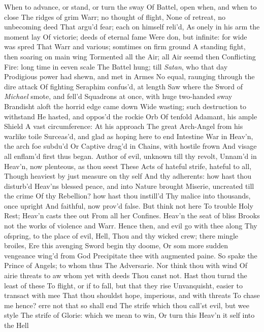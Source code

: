 \documentclass[11pt]{book}
\newcounter {first}
\begin{document}
When to advance, or stand, or turn the sway 
Of Battel, open when, and when to close 
The ridges of grim Warr; no thought of flight, 
None of retreat, no unbecoming deed 
That argu'd fear; each on himself reli'd, 
As onely in his arm the moment lay 
Of victorie; deeds of eternal fame 
Were don, but infinite: for wide was spred 
That Warr and various; somtimes on firm ground 
A standing fight, then soaring on main wing 
Tormented all the Air; all Air seemd then 
Conflicting Fire: long time in eeven scale 
The Battel hung; till \textit{Satan}, who that day 
Prodigious power had shewn, and met in Armes 
No equal, raunging through the dire attack 
Of fighting Seraphim confus'd, at length 
Saw where the Sword of \textit{Michael} smote, and fell'd 
Squadrons at once, with huge two-handed sway 
Brandisht aloft the horrid edge came down 
Wide wasting; such destruction to withstand 
He hasted, and oppos'd the rockie Orb 
Of tenfold Adamant, his ample Shield 
A vast circumference: At his approach 
The great Arch-Angel from his warlike toile 
Surceas'd, and glad as hoping here to end 
Intestine War in Heav'n, the arch foe subdu'd 
Or Captive drag'd in Chains, with hostile frown 
And visage all enflam'd first thus began. 
\quad Author of evil, unknown till thy revolt, 
Unnam'd in Heav'n, now plenteous, as thou seest 
These Acts of hateful strife, hateful to all, 
Though heaviest by just measure on thy self 
And thy adherents: how hast thou disturb'd 
Heav'ns blessed peace, and into Nature brought 
Miserie, uncreated till the crime 
Of thy Rebellion? how hast thou instill'd 
Thy malice into thousands, once upright 
And faithful, now prov'd false.  But think not here 
To trouble Holy Rest; Heav'n casts thee out 
From all her Confines.  Heav'n the seat of bliss 
Brooks not the works of violence and Warr. 
Hence then, and evil go with thee along 
Thy ofspring, to the place of evil, Hell, 
Thou and thy wicked crew; there mingle broiles, 
Ere this avenging Sword begin thy doome, 
Or som more sudden vengeance wing'd from God 
Precipitate thee with augmented paine. 
\quad So spake the Prince of Angels; to whom thus 
The Adversarie.  Nor think thou with wind 
Of airie threats to aw whom yet with deeds 
Thou canst not.  Hast thou turnd the least of these 
To flight, or if to fall, but that they rise 
Unvanquisht, easier to transact with mee 
That thou shouldst hope, imperious, and with threats 
To chase me hence? erre not that so shall end 
The strife which thou call'st evil, but wee style 
The strife of Glorie: which we mean to win, 
Or turn this Heav'n it self into the Hell 
\end{document}
